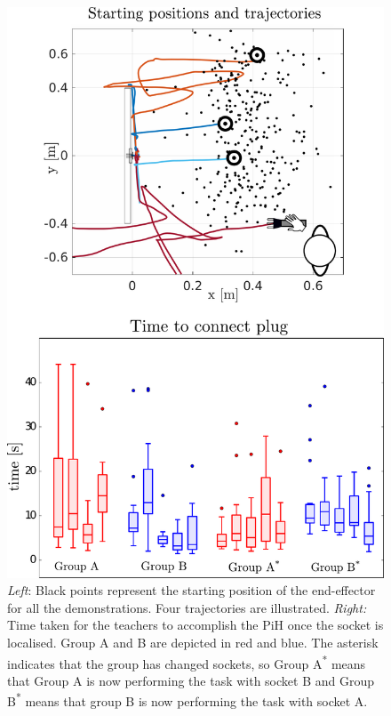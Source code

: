 \begin{figure}
 \centering
   \includegraphics[width=\textwidth]{./ch4-PiH/Figures/Fig/start_position_v2.pdf}
   \caption{\textit{Left}: Black points represent the starting position of the end-effector
   for all the demonstrations. Four trajectories are illustrated. \textit{Right:} 
   Time taken for the teachers to accomplish the PiH once the socket is localised. Group A and B are depicted in red 
   and blue. The asterisk indicates that the group has changed sockets, so Group A\textsuperscript{*} means
   that Group A is now performing the task with socket B and Group B\textsuperscript{*} means that group B is now performing 
   the task with socket A.}
  \label{fig:experiment_setup_data}
\end{figure}

